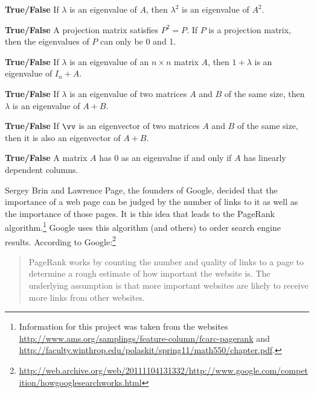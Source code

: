 \item \textbf{True/False} If $\lambda$ is an eigenvalue of $A$, then $\lambda^2$ is an eigenvalue of $A^2$.

\item \textbf{True/False} A projection matrix satisfies $P^2=P$. If $P$ is a projection matrix, then the eigenvalues of $P$ can only be 0 and 1.

\item \textbf{True/False} If $\lambda$ is an eigenvalue of an $n\times n$ matrix $A$, then $1+\lambda$ is an eigenvalue of $I_n+A$.

\item \textbf{True/False} If $\lambda$ is an eigenvalue of two matrices $A$ and $B$ of the same size, then $\lambda$ is an eigenvalue of $A+B$.

\item \textbf{True/False} If $\vv$ is an eigenvector of two matrices $A$ and $B$ of the same size, then it is also an eigenvector of $A+B$.

\item \textbf{True/False} A matrix $A$ has 0 as an eigenvalue if and only if $A$ has linearly dependent columns.

\ea
\ee

\label{sec:proj_pagerank}

Sergey Brin and Lawrence Page, the founders of Google, decided that the importance of a web page can be judged by the number of links to it as well as the importance of those pages. It is this idea that leads to the PageRank algorithm.\footnote{Information for this project  was taken from the websites \url{http://www.ams.org/samplings/feature-column/fcarc-pagerank} and \url{http://faculty.winthrop.edu/polaskit/spring11/math550/chapter.pdf}.} Google uses this algorithm (and others) to order search engine results. According to Google:\footnote{\url{http://web.archive.org/web/20111104131332/http://www.google.com/competition/howgooglesearchworks.html}}
\begin{quote}
PageRank works by counting the number and quality of links to a page to determine a rough estimate of how important the website is. The underlying assumption is that more important websites are likely to receive more links from other websites.
\end{quote}

